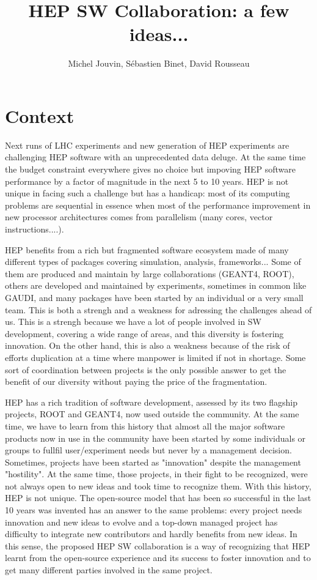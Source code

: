 \documentclass[11pt]{article} %
\title{HEP SW Collaboration: a few ideas...}
\author{Michel Jouvin, S\'ebastien Binet, David Rousseau}
\begin{document}
\maketitle

\section{Context}

Next runs of LHC experiments and new generation of HEP experiments are
challenging HEP software with an unprecedented data deluge. At the
same time the budget constraint everywhere gives no choice but
impoving HEP software performance by a factor of magnitude in the next
5 to 10 years. HEP is not unique in facing such a challenge but has a
handicap: most of its computing problems are sequential in essence
when most of the performance improvement in new processor
architectures comes from parallelism (many cores, vector
instructions....).

HEP benefits from a rich but fragmented software ecosystem made of
many different types of packages covering simulation, analysis,
frameworks... Some of them are produced and maintain by large
collaborations (GEANT4, ROOT), others are developed and maintained by
experiments, sometimes in common like GAUDI, and many packages have
been started by an individual or a very small team. This is both a
strengh and a weakness for adressing the challenges ahead of us. This
is a strengh because we have a lot of people involved in SW
development, covering a wide range of areas, and this diversity is
fostering innovation. On the other hand, this is also a weakness
because of the risk of efforts duplication at a time where manpower is
limited if not in shortage. Some sort of coordination between projects
is the only possible answer to get the benefit of our diversity
without paying the price of the fragmentation.

HEP has a rich tradition of software development, assessed by its two
flagship projects, ROOT and GEANT4, now used outside the community. At
the same time, we have to learn from this history that almost all the
major software products now in use in the community have been started
by some individuals or groups to fullfil user/experiment needs but
never by a management decision. Sometimes, projects have been started
as "innovation" despite the management "hostility". At the same time,
those projects, in their fight to be recognized, were not always open
to new ideas and took time to recognize them. With this history, HEP
is not unique. The open-source model that has been so successful in
the last 10 years was invented has an answer to the same problems:
every project needs innovation and new ideas to evolve and a top-down
managed project has difficulty to integrate new contributors and
hardly benefits from new ideas. In this sense, the proposed HEP SW
collaboration is a way of recognizing that HEP learnt from the
open-source experience and its success to foster innovation and to get
many different parties involved in the same project.
\end{document}
